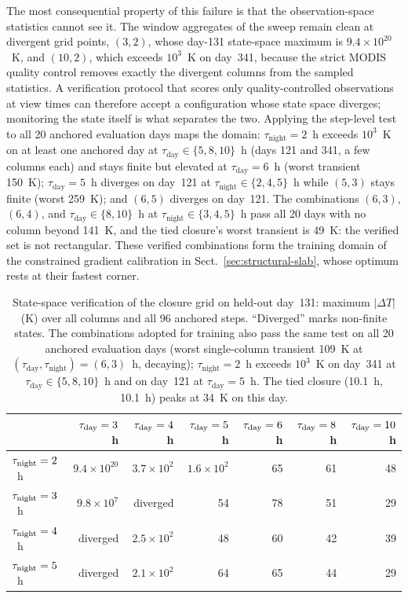 The most consequential property of this failure is that the
observation-space statistics cannot see it. The window aggregates of the
sweep remain clean at divergent grid points, $(3, 2)$, whose
day-131 state-space maximum is $9.4\times10^{20}$~K, and $(10, 2)$, which
exceeds $10^{3}$~K on day~341, because the strict MODIS quality control
removes exactly the divergent columns from the sampled statistics. A
verification protocol that scores only quality-controlled observations at
view times can therefore accept a configuration whose state space diverges;
monitoring the state itself is what separates the two. Applying the
step-level test to all 20 anchored evaluation days maps the
domain: $\tau_{\mathrm{night}} = 2$~h exceeds $10^{3}$~K on at least one
anchored day at $\tau_{\mathrm{day}} \in \{5, 8, 10\}$~h (days 121 and 341,
a few columns each) and stays finite but elevated at $\tau_{\mathrm{day}} =
6$~h (worst transient 150~K); $\tau_{\mathrm{day}} = 5$~h diverges on
day~121 at $\tau_{\mathrm{night}} \in \{2, 4, 5\}$~h while $(5, 3)$ stays
finite (worst 259~K); and $(6, 5)$ diverges on day~121. The combinations
$(6, 3)$, $(6, 4)$, and $\tau_{\mathrm{day}} \in \{8, 10\}$~h at
$\tau_{\mathrm{night}} \in \{3, 4, 5\}$~h pass all 20 days with no column
beyond 141~K, and the tied closure's worst transient is 49~K: the verified
set is not rectangular. These verified combinations form the training
domain of the constrained gradient calibration in
Sect.~\ref{sec:structural-slab}, whose optimum rests at their fastest
corner.

\begin{table}[t]
\caption{State-space verification of the closure grid on held-out day~131:
maximum $|\Delta T|$ (K) over all columns and all 96 anchored steps.
``Diverged'' marks non-finite states. The combinations adopted for training
also pass the same test on all 20 anchored evaluation days (worst
single-column transient 109~K at $(\tau_{\mathrm{day}}, \tau_{\mathrm{night}})
= (6, 3)$~h, decaying); $\tau_{\mathrm{night}} = 2$~h exceeds $10^{3}$~K on
day~341 at $\tau_{\mathrm{day}} \in \{5, 8, 10\}$~h and on day~121 at
$\tau_{\mathrm{day}} = 5$~h. The tied closure (10.1~h, 10.1~h) peaks at 34~K
on this day.}
\label{tab:asym-statespace}
\centering
\small
\begin{tabular}{lrrrrrr}
\hline
 & $\tau_{\rm day}=3$~h & $\tau_{\rm day}=4$~h & $\tau_{\rm day}=5$~h &
   $\tau_{\rm day}=6$~h & $\tau_{\rm day}=8$~h & $\tau_{\rm day}=10$~h \\
\hline
$\tau_{\rm night}=2$~h & $9.4\times10^{20}$ & $3.7\times10^{2}$ &
  $1.6\times10^{2}$ & 65 & 61 & 48 \\
$\tau_{\rm night}=3$~h & $9.8\times10^{7}$ & diverged &
  54 & 78 & 51 & 29 \\
$\tau_{\rm night}=4$~h & diverged & $2.5\times10^{2}$ & 48 & 60 & 42 & 39 \\
$\tau_{\rm night}=5$~h & diverged & $2.1\times10^{2}$ & 64 & 65 & 44 & 29 \\
\hline
\end{tabular}
\end{table}

